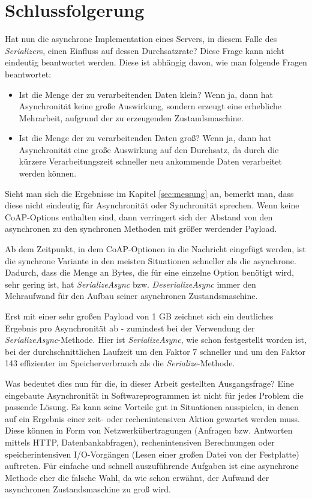 \section{Schlussfolgerung}
\label{sec:schlussfolgerung}

Hat nun die asynchrone Implementation eines Servers, in diesem Falle des \textit{Serializer}s, einen Einfluss auf dessen Durchsatzrate? Diese Frage kann nicht eindeutig beantwortet werden. Diese ist abhängig davon, wie man folgende Fragen beantwortet:
\begin{itemize}
    \item Ist die Menge der zu verarbeitenden Daten klein? Wenn ja, dann hat Asynchronität keine große Auswirkung, sondern erzeugt eine erhebliche Mehrarbeit, aufgrund der zu erzeugenden Zustandsmaschine.
    \item Ist die Menge der zu verarbeitenden Daten groß? Wenn ja, dann hat Asynchronität eine große Auswirkung auf den Durchsatz, da durch die kürzere Verarbeitungszeit schneller neu ankommende Daten verarbeitet werden können.
\end{itemize}

Sieht man sich die Ergebnisse im Kapitel \ref{sec:messung} an, bemerkt man, dass diese nicht eindeutig für Asynchronität oder Synchronität sprechen. Wenn keine CoAP-Options enthalten sind, dann verringert sich der Abstand von den asynchronen zu den synchronen Methoden mit größer werdender Payload.

Ab dem Zeitpunkt, in dem CoAP-Optionen in die Nachricht eingefügt werden, ist die synchrone Variante in den meisten Situationen schneller als die asynchrone. Dadurch, dass die Menge an Bytes, die für eine einzelne Option benötigt wird, sehr gering ist, hat \textit{SerializeAsync} bzw. \textit{DeserializeAsync} immer den Mehraufwand für den Aufbau seiner asynchronen Zustandsmaschine.

Erst mit einer sehr großen Payload von 1 GB zeichnet sich ein deutliches Ergebnis pro Asynchronität ab - zumindest bei der Verwendung der \textit{SerializeAsync}-Methode. Hier ist \textit{SerializeAsync}, wie schon festgestellt worden ist, bei der durchschnittlichen Laufzeit um den Faktor 7 schneller und um den Faktor 143 effizienter im Speicherverbrauch als die \textit{Serialize}-Methode. 

Was bedeutet dies nun für die, in dieser Arbeit gestellten Ausgangsfrage? Eine eingebaute Asynchronität in Softwareprogrammen ist nicht für jedes Problem die passende Lösung. Es kann seine Vorteile gut in Situationen ausspielen, in denen auf ein Ergebnis einer zeit- oder rechenintensiven Aktion gewartet werden muss. Diese können in Form von Netzwerkübertragungen (Anfragen bzw. Antworten mittels HTTP, Datenbankabfragen), rechenintensiven Berechnungen oder speicherintensiven I/O-Vorgängen (Lesen einer großen Datei von der Festplatte) auftreten. Für einfache und schnell auszuführende Aufgaben ist eine asynchrone Methode eher die falsche Wahl, da wie schon erwähnt, der Aufwand der asynchronen Zustandsmaschine zu groß wird.

